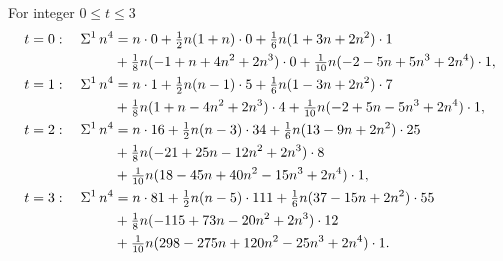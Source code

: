 \begin{example} 
  For integer $0 \leq t \leq 3$
  \begin{align*}
    t=0:\quad
    \Sigma^{1}\,{n}^{4}
    &= n\cdot0 + \tfrac12 n(1+n)\cdot0 + \tfrac16 n(1+3n+2n^2)\cdot1
    \\
    &+ \tfrac18 n(-1+n+4n^2+2n^3)\cdot0
    + \tfrac1{10} n(-2-5n+5n^3+2n^4)\cdot1,
    \\
    t=1:\quad
    \Sigma^{1}\,{n}^{4}
    &= n\cdot1 + \tfrac12 n(n-1)\cdot5 + \tfrac16 n(1-3n+2n^2)\cdot7
    \\
    &+ \tfrac18 n(1+n-4n^2+2n^3)\cdot4
    + \tfrac1{10} n(-2+5n-5n^3+2n^4)\cdot1,
    \\
    t=2:\quad
    \Sigma^{1}\,{n}^{4}
    &= n\cdot16 + \tfrac12 n(n-3)\cdot34 + \tfrac16 n(13-9n+2n^2)\cdot25
    \\
    &+ \tfrac18 n(-21+25n-12n^2+2n^3)\cdot8 \\
    &+ \tfrac1{10} n(18-45n+40n^2-15n^3+2n^4)\cdot1,
    \\
    t=3:\quad
    \Sigma^{1}\,{n}^{4}
    &= n\cdot81 + \tfrac12 n(n-5)\cdot111 + \tfrac16 n(37-15n+2n^2)\cdot55
    \\
    &+ \tfrac18 n(-115+73n-20n^2+2n^3)\cdot12 \\
    &+ \tfrac1{10} n(298-275n+120n^2-25n^3+2n^4)\cdot1.
  \end{align*}
\end{example}
